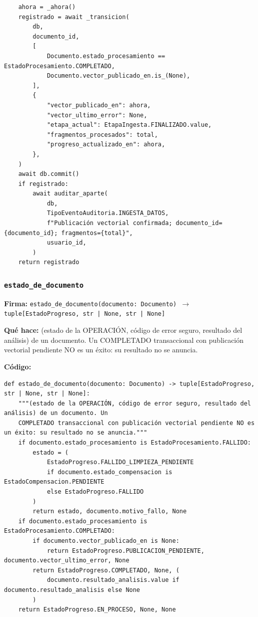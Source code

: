\documentclass[11pt,a4paper]{article}
\begin{document}
\begin{lstlisting}
    ahora = _ahora()
    registrado = await _transicion(
        db,
        documento_id,
        [
            Documento.estado_procesamiento == EstadoProcesamiento.COMPLETADO,
            Documento.vector_publicado_en.is_(None),
        ],
        {
            "vector_publicado_en": ahora,
            "vector_ultimo_error": None,
            "etapa_actual": EtapaIngesta.FINALIZADO.value,
            "fragmentos_procesados": total,
            "progreso_actualizado_en": ahora,
        },
    )
    await db.commit()
    if registrado:
        await auditar_aparte(
            db,
            TipoEventoAuditoria.INGESTA_DATOS,
            f"Publicación vectorial confirmada; documento_id={documento_id}; fragmentos={total}",
            usuario_id,
        )
    return registrado
\end{lstlisting}

\subsubsection*{\texttt{estado\_de\_documento}}
\textbf{Firma:} \texttt{estado\_de\_documento(documento: Documento) $\rightarrow$ tuple[EstadoProgreso, str | None, str | None]}

\textbf{Qué hace:} (estado de la OPERACIÓN, código de error seguro, resultado del análisis) de un documento. Un
COMPLETADO transaccional con publicación vectorial pendiente NO es un éxito: su resultado no se anuncia.

\textbf{Código:}
\begin{lstlisting}
def estado_de_documento(documento: Documento) -> tuple[EstadoProgreso, str | None, str | None]:
    """(estado de la OPERACIÓN, código de error seguro, resultado del análisis) de un documento. Un
    COMPLETADO transaccional con publicación vectorial pendiente NO es un éxito: su resultado no se anuncia."""
    if documento.estado_procesamiento is EstadoProcesamiento.FALLIDO:
        estado = (
            EstadoProgreso.FALLIDO_LIMPIEZA_PENDIENTE
            if documento.estado_compensacion is EstadoCompensacion.PENDIENTE
            else EstadoProgreso.FALLIDO
        )
        return estado, documento.motivo_fallo, None
    if documento.estado_procesamiento is EstadoProcesamiento.COMPLETADO:
        if documento.vector_publicado_en is None:
            return EstadoProgreso.PUBLICACION_PENDIENTE, documento.vector_ultimo_error, None
        return EstadoProgreso.COMPLETADO, None, (
            documento.resultado_analisis.value if documento.resultado_analisis else None
        )
    return EstadoProgreso.EN_PROCESO, None, None
\end{lstlisting}
\end{document}
